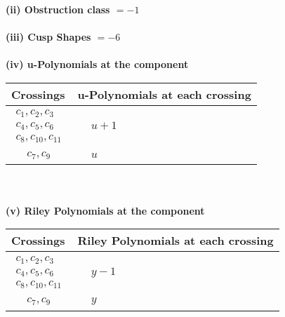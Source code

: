 \documentclass[1p]{elsarticle_modified}
\theoremstyle{definition}
\begin{document}
\flushleft \textbf{(ii) Obstruction class $= -1$}\\~\\
\flushleft \textbf{(iii) Cusp Shapes $= -6$}\\~\\
\newpage\renewcommand{\arraystretch}{1}
\flushleft \textbf{(iv) u-Polynomials at the component}\newline \\
\begin{tabular}{m{50pt}|m{274pt}}
Crossings & \hspace{64pt}u-Polynomials at each crossing \\
\hline $$\begin{aligned}c_{1},c_{2},c_{3}\\c_{4},c_{5},c_{6}\\c_{8},c_{10},c_{11}\end{aligned}$$&$\begin{aligned}
&u+1
\end{aligned}$\\
\hline $$\begin{aligned}c_{7},c_{9}\end{aligned}$$&$\begin{aligned}
&u
\end{aligned}$\\
\hline
\end{tabular}\\~\\
\newpage\renewcommand{\arraystretch}{1}
\flushleft \textbf{(v) Riley Polynomials at the component}\newline \\
\begin{tabular}{m{50pt}|m{274pt}}
Crossings & \hspace{64pt}Riley Polynomials at each crossing \\
\hline $$\begin{aligned}c_{1},c_{2},c_{3}\\c_{4},c_{5},c_{6}\\c_{8},c_{10},c_{11}\end{aligned}$$&$\begin{aligned}
&y-1
\end{aligned}$\\
\hline $$\begin{aligned}c_{7},c_{9}\end{aligned}$$&$\begin{aligned}
&y
\end{aligned}$\\
\hline
\end{tabular}\\~\\
\end{document}
